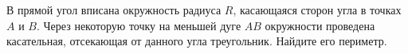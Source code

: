 \begin{ex}
	\begin{condition}
		В прямой угол вписана окружность радиуса \( R \), касающаяся сторон угла в точках \( A  \) и \( B \). Через некоторую точку	на меньшей дуге \( AB  \) окружности проведена касательная, отсекающая от данного угла треугольник. Найдите его периметр.
	\end{condition}
\end{ex}